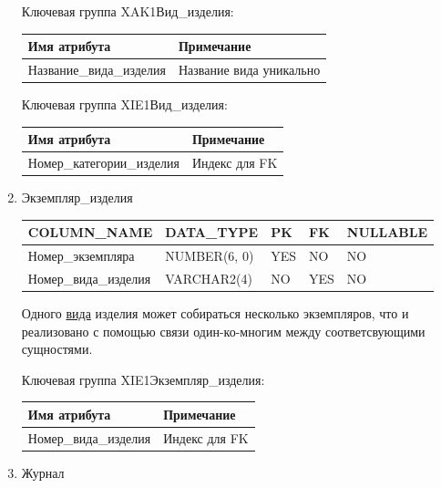 \begin{enumerate}
    Ключевая группа XAK1Вид\_изделия:

    \begin{tabular}{|p{7cm}|p{9.3cm}|} \hline

        {\bf Имя атрибута} & {\bf Примечание} \\ \hline
        Название\_вида\_изделия & Название вида уникально \\ \hline

    \end{tabular}

    Ключевая группа XIE1Вид\_изделия:

    \begin{tabular}{|p{7cm}|p{9.3cm}|} \hline

        {\bf Имя атрибута} & {\bf Примечание} \\ \hline
        Номер\_категории\_изделия & Индекс для FK \\ \hline

    \end{tabular}

    \item{Экземпляр\_изделия}

    \begin{tabular}{|p{7cm}|p{3cm}|p{1cm}|p{1cm}|p{3cm}|} \hline

        {\bf COLUMN\_NAME} & {\bf DATA\_TYPE} & {\bf PK} & {\bf FK} & {\bf NULLABLE} \\ \hline
        Номер\_экземпляра & NUMBER(6, 0) & YES & NO & NO \\ \hline
        Номер\_вида\_изделия & VARCHAR2(4) & NO & YES & NO \\ \hline

    \end{tabular}

    Одного \underline{вида} изделия может собираться несколько экземпляров, что и реализовано с помощью связи один-ко-многим между соответсвующими сущностями.

    Ключевая группа XIE1Экземпляр\_изделия:

    \begin{tabular}{|p{7cm}|p{9.3cm}|} \hline

        {\bf Имя атрибута} & {\bf Примечание} \\ \hline
        Номер\_вида\_изделия & Индекс для FK \\ \hline

    \end{tabular}

    \item{Журнал}


\end{enumerate}
